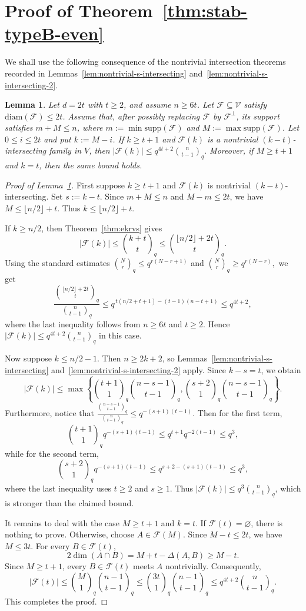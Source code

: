 \documentclass[11pt]{article}
\newtheorem{lemma}[theorem]{Lemma}
\theoremstyle{definition}
\newcommand{\qbinom}[2]{\genfrac{(}{)}{0pt}{}{#1}{#2}_q}
\newcommand{\diam}{\mathrm{diam}}
\newcommand{\supp}{\mathrm{supp}}
\begin{document}
\section{Proof of Theorem~\ref{thm:stab-typeB-even}}\label{sec:stab-even-B}
We shall use the following consequence of the nontrivial intersection theorems recorded in Lemmas~\ref{lem:nontrivial-s-intersecting} and~\ref{lem:nontrivial-s-intersecting-2}.
\begin{lemma}\label{lem:typeB-nontrivial-layer-bound}
Let $d=2t$ with $t\ge 2$, and assume $n\ge 6t$.
Let $\mathcal F\subseteq\mathcal V$ satisfy $\diam(\mathcal F)\le 2t$.
Assume that, after possibly replacing $\mathcal F$ by $\mathcal F^\perp$, its support satisfies $m+M\le n$, where $m:=\min\supp(\mathcal F)$ and $M:=\max\supp(\mathcal F)$. Let $0\le i\le 2t$ and put $k:=M-i$. If $k\ge t+1$ and $\mathcal F(k)$ is a nontrivial $(k-t)$-intersecting family in $V$, then
\(
|\mathcal F(k)|\le q^{4t+2}\qbinom{n}{t-1}.
\)
Moreover, if $M \ge t+1$ and $k=t$, then the same bound holds.
\end{lemma}
\begin{proof}[Proof of Lemma~\ref{lem:typeB-nontrivial-layer-bound}]
First suppose $k\ge t+1$ and $\mathcal F(k)$ is nontrivial $(k-t)$-intersecting. 
Set $s:=k-t$. 
Since $m+M\le n$ and $M-m\le 2t$, we have $M\le \lfloor n/2\rfloor+t$. 
Thus $k\le \lfloor n/2\rfloor+t$.

If $k\ge n/2$, then Theorem~\ref{thm:ekrvs} gives
\[
|\mathcal F(k)|\le \qbinom{k+t}{t}\le \qbinom{\lfloor n/2\rfloor+2t}{t}.
\]
Using the standard estimates
\(
\qbinom Nr\le q^{r(N-r+1)}\) and
\(
\qbinom Nr\ge q^{r(N-r)},
\)
we get
\[
\frac{\qbinom{\lfloor n/2\rfloor+2t}{t}}{\qbinom{n}{t-1}}
\le
q^{\,t(n/2+t+1)-(t-1)(n-t+1)}
\le q^{4t+2},
\]
where the last inequality follows from \(n\ge6t\) and \(t\ge2\). Hence $|\mathcal F(k)|\le q^{4t+2}\qbinom{n}{t-1}$ in this case.

Now suppose $k\le n/2-1$. 
Then $n\ge 2k+2$, so Lemmas~\ref{lem:nontrivial-s-intersecting} and~\ref{lem:nontrivial-s-intersecting-2} apply. 
Since $k-s=t$, we obtain
\[
|\mathcal F(k)|
\le
\max\left\{
\qbinom{t+1}{1}\qbinom{n-s-1}{t-1},
\qbinom{s+2}{1}\qbinom{n-s-1}{t-1}
\right\}.
\]
Furthermore, notice that
\(
\frac{\qbinom{n-s-1}{t-1}}{\qbinom{n}{t-1}}
\le q^{-(s+1)(t-1)}.
\)
Then for the first term,
\[
\qbinom{t+1}{1}q^{-(s+1)(t-1)}
\le q^{t+1}q^{-2(t-1)}
\le q^{3},
\]
while for the second term,
\[
\qbinom{s+2}{1}q^{-(s+1)(t-1)}
\le q^{s+2-(s+1)(t-1)}
\le q^{3},
\]
where the last inequality uses $t\ge 2$ and $s\ge 1$. 
Thus $|\mathcal F(k)|\le q^3\qbinom{n}{t-1}$, which is stronger than the claimed bound.

It remains to deal with the case $M\ge t+1$ and $k=t$. 
If $\mathcal F(t)=\varnothing$, there is nothing to prove. 
Otherwise, choose $A\in\mathcal F(M)$. 
Since $M-t\le 2t$, we have $M\le 3t$. 
For every $B\in\mathcal F(t)$,
\[
2\dim(A\cap B)=M+t-\Delta(A,B)\ge M-t.
\]
Since $M\ge t+1$, every $B\in\mathcal F(t)$ meets $A$ nontrivially. 
Consequently,
\[
|\mathcal F(t)|
\le
\qbinom{M}{1}\qbinom{n-1}{t-1}
\le
\qbinom{3t}{1}\qbinom{n-1}{t-1}
\le
q^{4t+2}\qbinom{n}{t-1}.
\]
This completes the proof.
    
\end{proof}
\end{document}
